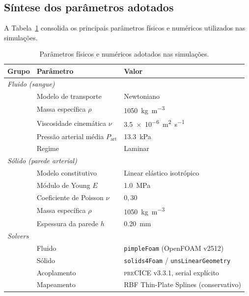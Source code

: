 \subsection{Síntese dos parâmetros adotados}
\label{sec:metodologia-tabela}

A Tabela~\ref{tab:parametros} consolida os principais parâmetros físicos
e numéricos utilizados nas simulações.

\begin{table}[htbp]
  \centering
  \caption{Parâmetros físicos e numéricos adotados nas simulações.}
  \label{tab:parametros}
  \small
  \begin{tabular}{@{}lll@{}}
    \toprule
    \textbf{Grupo} & \textbf{Parâmetro} & \textbf{Valor} \\
    \midrule
    \multicolumn{3}{l}{\emph{Fluido (sangue)}} \\
    & Modelo de transporte               & Newtoniano \\
    & Massa específica \(\rho\)          & \SI{1050}{\kilogram\per\meter\cubed} \\
    & Viscosidade cinemática \(\nu\)     & \SI{3,5e-6}{\square\meter\per\second} \\
    & Pressão arterial média \(P_{\mathrm{art}}\) & \SI{13,3}{\kilo\pascal} \\
    & Regime                             & Laminar \\
    \midrule
    \multicolumn{3}{l}{\emph{Sólido (parede arterial)}} \\
    & Modelo constitutivo                & Linear elástico isotrópico \\
    & Módulo de Young \(E\)              & \SI{1,0}{\mega\pascal} \\
    & Coeficiente de Poisson \(\nu\)     & \(0{,}30\) \\
    & Massa específica \(\rho\)          & \SI{1050}{\kilogram\per\meter\cubed} \\
    & Espessura da parede \(h\)          & \SI{0,20}{\milli\meter} \\
    \midrule
    \multicolumn{3}{l}{\emph{Solvers}} \\
    & Fluido                             & \texttt{pimpleFoam} (OpenFOAM v2512) \\
    & Sólido                             & \texttt{solids4Foam} / \texttt{unsLinearGeometry} \\
    & Acoplamento                        & \textsc{preCICE} v3.3.1, serial explícito \\
    & Mapeamento                         & RBF Thin-Plate Splines (conservativo) \\

\end{tabular}
\end{table}
